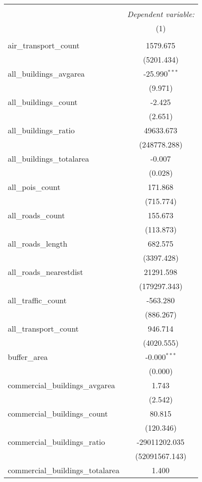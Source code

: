 \begin{table}[!htbp] \centering
\begin{tabular}{@{\extracolsep{5pt}}lc}
\\[-1.8ex]\hline
\hline \\[-1.8ex]
& \multicolumn{1}{c}{\textit{Dependent variable:}} \
\cr \cline{1-2}
\\[-1.8ex] & (1) \\
\hline \\[-1.8ex]
 air_transport_count & 1579.675$^{}$ \\
  & (5201.434) \\
 all_buildings_avgarea & -25.990$^{***}$ \\
  & (9.971) \\
 all_buildings_count & -2.425$^{}$ \\
  & (2.651) \\
 all_buildings_ratio & 49633.673$^{}$ \\
  & (248778.288) \\
 all_buildings_totalarea & -0.007$^{}$ \\
  & (0.028) \\
 all_pois_count & 171.868$^{}$ \\
  & (715.774) \\
 all_roads_count & 155.673$^{}$ \\
  & (113.873) \\
 all_roads_length & 682.575$^{}$ \\
  & (3397.428) \\
 all_roads_nearestdist & 21291.598$^{}$ \\
  & (179297.343) \\
 all_traffic_count & -563.280$^{}$ \\
  & (886.267) \\
 all_transport_count & 946.714$^{}$ \\
  & (4020.555) \\
 buffer_area & -0.000$^{***}$ \\
  & (0.000) \\
 commercial_buildings_avgarea & 1.743$^{}$ \\
  & (2.542) \\
 commercial_buildings_count & 80.815$^{}$ \\
  & (120.346) \\
 commercial_buildings_ratio & -29011202.035$^{}$ \\
  & (52091567.143) \\
 commercial_buildings_totalarea & 1.400$^{}$ \\

\end{tabular}
\end{table}
